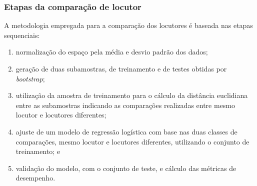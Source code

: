 \documentclass[121pt, aspectratio=169, t]{beamer}
\begin{document}
\begin{frame}[fragile=singleslide]
	\frametitle{Etapas da comparação de locutor}
	A metodologia empregada para a comparação dos locutores é baseada nas etapas sequenciais: 
	\begin{enumerate}
		\item normalização do espaço pela média e desvio padrão dos dados;
		\item geração de duas subamostras, de treinamento e de testes obtidas por \textit{bootstrap};
		\item utilização da amostra de treinamento para o cálculo da distância euclidiana entre as subamostras indicando as comparações realizadas entre mesmo locutor e  locutores diferentes;
		\item ajuste de um modelo de regressão logística com base nas duas classes de comparações,  mesmo locutor e  locutores diferentes, utilizando o conjunto de treinamento; e 
		\item validação do modelo, com o conjunto de teste, e cálculo das métricas de desempenho.
	\end{enumerate}

\end{frame}
\end{document}

